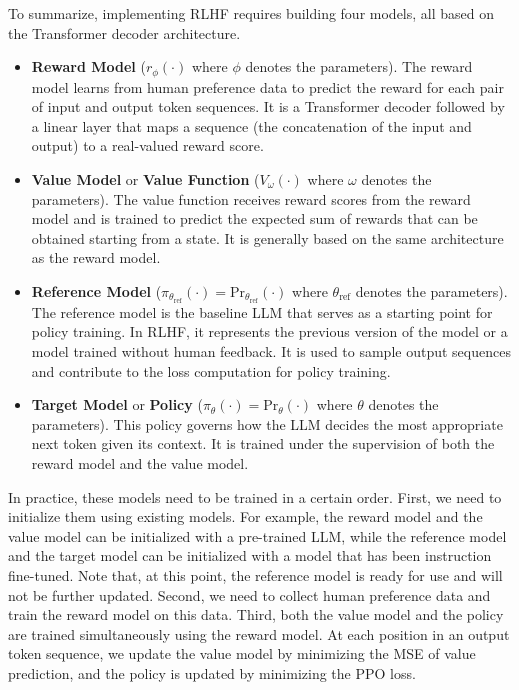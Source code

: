 To summarize, implementing RLHF requires building four models, all based on the Transformer decoder architecture.

\begin{itemize}
\item \vspace{0.5em} \textbf{Reward Model} ($r_{\phi}(\cdot)$ where $\phi$ denotes the parameters). The reward model learns from human preference data to predict the reward for each pair of input and output token sequences. It is a Transformer decoder followed by a linear layer that maps a sequence (the concatenation of the input and output) to a real-valued reward score.
\item \vspace{0.3em} \textbf{Value Model} or \textbf{Value Function} ($V_{\omega}(\cdot)$ where $\omega$ denotes the parameters). The value function receives reward scores from the reward model and is trained to predict the expected sum of rewards that can be obtained starting from a state. It is generally based on the same architecture as the reward model.
\item \vspace{0.3em} \textbf{Reference Model} ($\pi_{\theta_{\mathrm{ref}}}(\cdot) = \mathrm{Pr}_{\theta_{\mathrm{ref}}}(\cdot)$ where $\theta_{\mathrm{ref}}$ denotes the parameters). The reference model is the baseline LLM that serves as a starting point for policy training. In RLHF, it represents the previous version of the model or a model trained without human feedback. It is used to sample output sequences and contribute to the loss computation for policy training.
\item \vspace{0.3em} \textbf{Target Model} or \textbf{Policy} ($\pi_{\theta}(\cdot) = \mathrm{Pr}_{\theta}(\cdot)$ where $\theta$ denotes the parameters). This policy governs how the LLM decides the most appropriate next token given its context. It is trained under the supervision of both the reward model and the value model.
\end{itemize}
\vspace{0.5em}

In practice, these models need to be trained in a certain order. First, we need to initialize them using existing models. For example, the reward model and the value model can be initialized with a pre-trained LLM, while the reference model and the target model can be initialized with a model that has been instruction fine-tuned. Note that, at this point, the reference model is ready for use and will not be further updated. Second, we need to collect human preference data and train the reward model on this data. Third, both the value model and the policy are trained simultaneously using the reward model. At each position in an output token sequence, we update the value model by minimizing the MSE of value prediction, and the policy is updated by minimizing the PPO loss.

